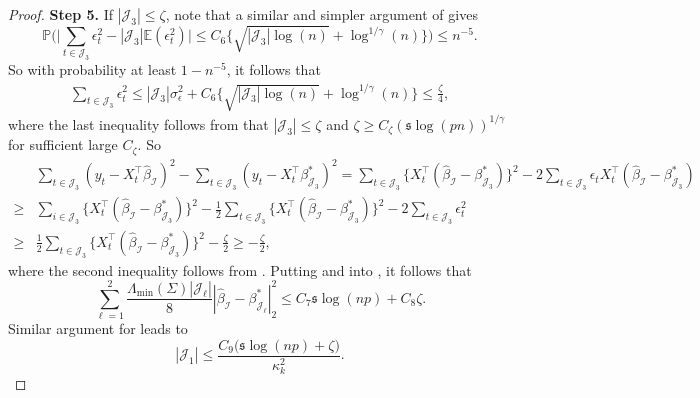 \documentclass[11pt]{article}
\newcommand{\I}{{\mathcal I }}
\newcommand{\J}{{  \mathcal J } }
\newcommand{\E}{ { \mathbb{E} } }
\newcommand{\s}{ { \mathfrak{s}  } }
\newcommand{\p}{\mathbb P}
\theoremstyle{plain}
\theoremstyle{definition}
\begin{document}
\begin{proof}
 
{\bf Step 5.}  If $|\J_{3}| \le \zeta $, note that  a similar and simpler argument of     gives 
$$ \p\bigg( \bigg| \sum_{t\in \J_3} \epsilon_t ^2 -|\J_3| \E(\epsilon_t^2) \bigg| \le  C _6  \bigg\{  \sqrt {|\J_3|   \log( n)   }  +    \log^{1/\gamma }(  n )   \bigg \}  \bigg) \le n^{-5} .   $$
So with probability at least $1-n^{-5} $, it follows that 
\begin{align}\label{eq:two change points small intervals epsilon}   \sum_{t\in \J_3} \epsilon_t ^2   \le |\J_3|\sigma_{\epsilon}^2  +
 C _6  \bigg\{  \sqrt {|\J_3|   \log( n)   }  +    \log^{1/\gamma }(  n )   \bigg \} 
 \le \frac{\zeta}{4}, \end{align} 
 where the last inequality follows from that $  |\J_3| \le  \zeta$ and $\zeta \ge  C_\zeta(\s\log(pn) )^{1/\gamma}$ for sufficient large $C_{\zeta}$. 
So
\begin{align} & \sum_{t  \in \J_3    }(y_t  - X_t ^\top  \widehat \beta _\I ) ^2  - \sum_{ t  \in \J_ 3    }(y_t  - X_t ^\top    \beta^*  _{\J_ 3 }  ) ^2 \nonumber 
=   \sum_{t  \in \J_ 3    }\big\{ X_t ^\top (\widehat \beta _\I -\beta^*  _{\J_ 3  } )\big\}^2 -2 \sum_{ t  \in \J_ 3    } \epsilon_t  X_t ^\top (\widehat \beta _\I -\beta^*  _{\J_ 3   }  )
\\  \nonumber 
\ge  & \sum_{i \in \J_ 3     }\big\{ X_ t ^\top (\widehat \beta _\I -\beta^*  _{\J_ 3   } )\big\}^2  -\frac{1}{2 }\sum_{t  \in \J_ 3     }\big\{ X_t ^\top (\widehat \beta _\I -\beta^*  _{\J_ 3   } )\big\}^2  - 2   \sum_{t  \in \J_ 3     }\epsilon_t ^2 
\\   
\ge &  \frac{1}{2 }\sum_{t  \in \J_ 3     }\big\{ X_t ^\top (\widehat \beta _\I -\beta^*  _{\J_ 3   } )\big\}^2  -\frac{\zeta}{2}
\ge -\frac{\zeta}{2},  \label{eq:regression change point step 4 last item}
\end{align} 
where the second inequality follows from . Putting  and   into ,
it follows that 
 $$  \sum_{\ell =1}^2 \frac{ \Lambda_{\min}(\Sigma) |\J_\ell | }{8}  |\widehat \beta _\I  -  \beta^* _{\J_ \ell  }  |_2^2      \le C_7 \s \log(np)  +C_8\zeta  .$$
  Similar argument for  leads to 
 $$   |\J_1|    \le\frac{ C_{9} \big(  \s \log(np)   +  \zeta \big)  }{\kappa_k ^2}  .$$  

 \end{proof} 
\end{document}

